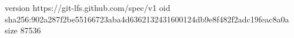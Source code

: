 version https://git-lfs.github.com/spec/v1
oid sha256:902a287f2be55166723aba4d6362132431600124db9e8f482f2adc19feac8a0a
size 87536
